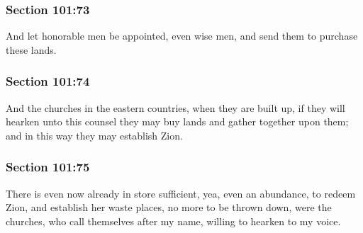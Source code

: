 	\subsubsection{Section 101:73} %
		\label{DC101-73}

		And let honorable men be appointed, even wise men, and send them to purchase these lands.


	\subsubsection{Section 101:74} %
		\label{DC101-74}

		And the churches in the eastern countries, when they are built up, if they will hearken unto this counsel they may buy lands and gather together upon them; and in this way they may establish Zion.


	\subsubsection{Section 101:75} %
		\label{DC101-75}

		There is even now already in store sufficient, yea, even an abundance, to redeem Zion, and establish her waste places, no more to be thrown down, were the churches, who call themselves after my name, willing to hearken to my voice.


